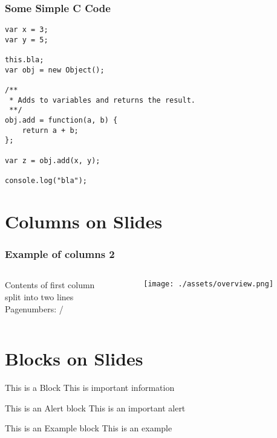 \begin{frame}[fragile]
\frametitle{Some Simple C Code}

\begin{lstlisting}[caption=Some JavaScript code,label={lst:lstlisting}]
var x = 3;
var y = 5;

this.bla;
var obj = new Object();

/**
 * Adds to variables and returns the result.
 **/
obj.add = function(a, b) {
	return a + b;
};

var z = obj.add(x, y);

console.log("bla");

\end{lstlisting}
\end{frame}

\section{Columns on Slides}\label{sec:columns-on-slides}

\begin{frame}
	\frametitle{Example of columns 2}
	\begin{columns}[T] %
	\begin{column}[T]{5cm} %
	Contents of first column \\ split into two lines \\
	Pagenumbers: \insertframenumber/\inserttotalframenumber
	\end{column}
	\begin{column}[T]{5cm} %
          		\texttt{[image: ./assets/overview.png]}
	\end{column}
	\end{columns}
\end{frame}


\section{Blocks on Slides}\label{sec:blocks-on-slides}


\begin{frame}

   \begin{block}{This is a Block}
      This is important information
   \end{block}

   \begin{alertblock}{This is an Alert block}
   This is an important alert
   \end{alertblock}

   \begin{exampleblock}{This is an Example block}
   This is an example
   \end{exampleblock}

\end{frame}
